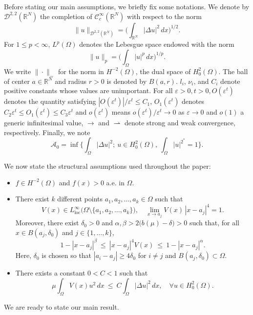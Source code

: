 \documentclass[reqno]{amsart}
\begin{document}
Before stating our main assumptions, we briefly fix some notations.
We denote by \(\mathcal{D}^{2,2}(\mathbb{R}^N)\) the completion of
\(\mathcal{C}_c^{\infty}(\mathbb{R}^N)\) with respect to the norm
\[
 \|u\|_{\mathcal{D}^{2,2}(\mathbb{R}^N)}
 =\Big( \int_{\mathbb{R}^N} |\Delta u|^2 \, dx \Big)^{1/2}.
\]
For \(1 \leq p < \infty\), \(L^p(\Omega)\) denotes the Lebesgue space endowed with
the norm
\[
 \|u\|_{p}=\Big( \int_{\Omega} |u|^p \, dx \Big)^{1/p}.
\]
We write \(\|\cdot\|_{-}\) for the norm in \(H^{-2}(\Omega)\), the dual space of
\(H^2_0(\Omega)\).
The ball of center \(a \in \mathbb{R}^N\) and radius \(r>0\) is denoted by
 \(B(a,r)\). \(l_i\), \(\nu_i\), and \(C_i\) denote positive constants whose values
 are unimportant. For all \(\varepsilon>0, t>0, O(\varepsilon^t)\) denotes the
quantity satisfying \(|O(\varepsilon^t)|/\varepsilon^t\leq C_1\),
\( O_1(\varepsilon^t)\) denotes \(C_2\varepsilon^t \leqslant O_1(\varepsilon^t)
\leqslant C_3\varepsilon^t\) and \(o(\varepsilon^t)\) means
\(o(\varepsilon^t)/\varepsilon^t\to 0\) as
 \(\varepsilon \to 0\) and \(o(1)\) a generic infinitesimal value,
\(\to\) and \(\rightharpoonup\) denote strong and weak convergence,
respectively. Finally, we note
\[ \label{(A0)}
 \mathcal{A}_{0}=\inf\Big\{ \int_{\Omega }\vert \Delta
u\vert ^{2}; \ u\in H^2_0(\Omega), \ \int _{\Omega}|u|^{2^*}=1 \Big\}.
\]

 We now state the structural assumptions used throughout the paper:
\begin{itemize}
\item[(A1)] \( f \in H^{-2}(\Omega) \) and \( f(x) > 0 \) a.e. in \( \Omega \).

\item[(A2)] There exist $k$ different points \( a_1,a_2,\dots,a_k \in \Omega \) such that
\[
 V(x) \in L^{\infty}_{\mathrm{loc}}\big(\Omega \setminus \{a_1,a_2,\dots,a_k\}\big),
 \quad \lim_{x \to a_j} V(x)\,|x-a_j|^4 = 1.
\]
Moreover, there exist \( \delta_0 > 0 \) and \( \alpha, \beta > 2\big(b(\mu)
- \delta\big) > 0 \) such that, for all \( x \in B(a_j, \delta_0) \) and
\( j \in \{1,\dots,k\} \),
\begin{equation}\label{v}
 1 - |x-a_j|^{\beta} \ \leq\ |x-a_j|^4 V(x) \ \leq\ 1 - |x-a_j|^{\alpha}.
\end{equation}
Here, \( \delta_0 \) is chosen so that \( |a_i-a_j| \geq 4\delta_0 \) for
\( i \neq j \) and \( B(a_j, \delta_0) \subset \Omega \).

\item[(A3)] There exists a constant \( 0 < C < 1 \) such that
\[
 \mu \int_{\Omega} V(x) u^2\,dx \ \leq\ C \int_{\Omega} |\Delta u|^2\,dx,
 \quad \forall u \in H^2_0(\Omega).
\]
\end{itemize}
We are ready to state our main result.
\end{document}
